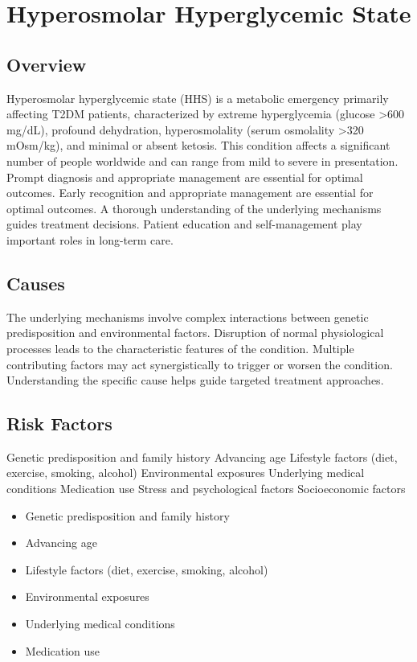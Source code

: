 \chapter{Hyperosmolar Hyperglycemic State}
\label{sec:Hyperosmolar Hyperglycemic State}

\section{Overview}
Hyperosmolar hyperglycemic state (HHS) is a metabolic emergency primarily affecting T2DM patients, characterized by extreme hyperglycemia (glucose >600 mg/dL), profound dehydration, hyperosmolality (serum osmolality >320 mOsm/kg), and minimal or absent ketosis. This condition affects a significant number of people worldwide and can range from mild to severe in presentation. Prompt diagnosis and appropriate management are essential for optimal outcomes. Early recognition and appropriate management are essential for optimal outcomes. A thorough understanding of the underlying mechanisms guides treatment decisions. Patient education and self-management play important roles in long-term care.
\section{Causes}
The underlying mechanisms involve complex interactions between genetic predisposition and environmental factors. Disruption of normal physiological processes leads to the characteristic features of the condition. Multiple contributing factors may act synergistically to trigger or worsen the condition. Understanding the specific cause helps guide targeted treatment approaches.
\section{Risk Factors}
Genetic predisposition and family history Advancing age Lifestyle factors (diet, exercise, smoking, alcohol) Environmental exposures Underlying medical conditions Medication use Stress and psychological factors Socioeconomic factors

\begin{itemize}[noitemsep]
  \item Genetic predisposition and family history
  \item Advancing age
  \item Lifestyle factors (diet, exercise, smoking, alcohol)
  \item Environmental exposures
  \item Underlying medical conditions
  \item Medication use
\end{itemize}
